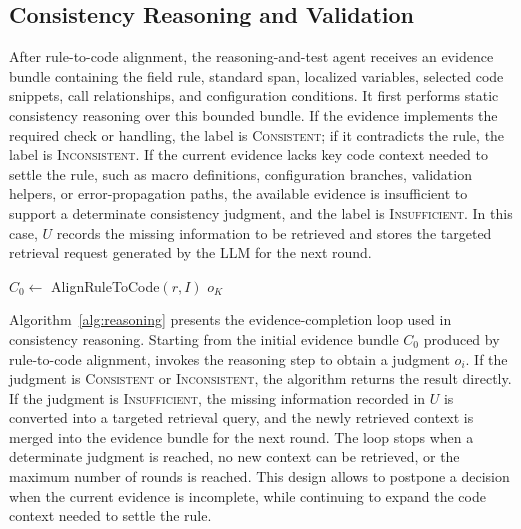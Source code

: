 
\subsection{Consistency Reasoning and Validation}
\label{sec:reasoning}
\label{sec:testagent}

After rule-to-code alignment, the reasoning-and-test agent receives an evidence
bundle containing the field rule, standard span, localized variables, selected
code snippets, call relationships, and configuration conditions. It first
performs static consistency reasoning over this bounded bundle. If the evidence
implements the required check or handling, the label is
\textsc{Consistent}; if it contradicts the rule, the label is
\textsc{Inconsistent}. If the current evidence lacks key code context needed
to settle the rule, such as macro definitions, configuration branches,
validation helpers, or error-propagation paths, the available evidence is
insufficient to support a determinate consistency judgment, and the label is
\textsc{Insufficient}. In this case, $U$ records the missing information to be
retrieved and stores the targeted retrieval request generated by the LLM for
the next round.

\begin{algorithm}
\small
\DontPrintSemicolon
{}
$C_0 \leftarrow$ AlignRuleToCode$(r,I)$\;
\Return $o_K$\;
\caption{Evidence-driven consistency reasoning.}
\label{alg:reasoning}
\end{algorithm}

Algorithm~\ref{alg:reasoning} presents the evidence-completion loop used in
consistency reasoning. Starting from the initial evidence bundle $C_0$ produced
by rule-to-code alignment, \tool{} invokes the reasoning step to obtain a
judgment $o_i$. If the judgment is \textsc{Consistent} or
\textsc{Inconsistent}, the algorithm returns the result directly. If the
judgment is \textsc{Insufficient}, the missing information recorded in $U$ is
converted into a targeted retrieval query, and the newly retrieved context is
merged into the evidence bundle for the next round. The loop stops when a
determinate judgment is reached, no new context can be retrieved, or the
maximum number of rounds is reached. This design allows \tool{} to postpone a
decision when the current evidence is incomplete, while continuing to expand
the code context needed to settle the rule.

